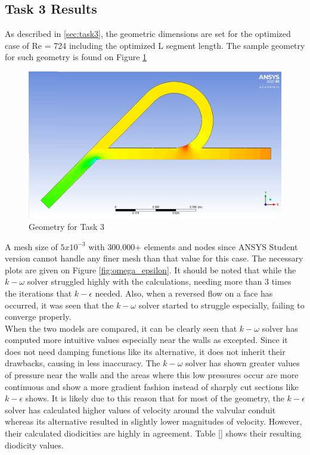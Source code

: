 \subsection{Task 3 Results}
\label{sec:task3results}

As described in \ref{sec:task3}, the geometric dimensions are set for the optimized case of Re = 724 including the optimized L segment length. The sample geometry for such geometry is found on Figure \ref{fig:task3sketch}

\begin{figure}[H]
    \centering
    \includegraphics[width=.7\textwidth]{images/task3/sketch.png}
    \caption{Geometry for Task 3}
    \label{fig:task3sketch}
\end{figure}

A mesh size of $5x10^{-3}$ with 300.000+ elements and nodes since ANSYS Student version cannot handle any finer mesh than that value for this case. The necessary plots are given on Figure \ref{fig:omega_epsilon}. It should be noted that while the $k - \omega$ solver struggled highly with the calculations, needing more than 3 times the iterations that $k- \epsilon$ needed. Also, when a reversed flow on a face has occurred, it was seen that the $k - \omega$ solver started to struggle especially, failing to converge properly. \\

When the two models are compared, it can be clearly seen that $k - \omega$ solver has computed more intuitive values especially near the walls as excepted. Since it does not need damping functions like its alternative, it does not inherit their drawbacks, causing in less inaccuracy. The $k - \omega$ solver has shown greater values of pressure near the walls and the areas where this low pressures occur are more continuous and show a more gradient fashion instead of sharply cut sections like $k - \epsilon$ shows. It is likely due to this reason that for most of the geometry, the $k - \epsilon$ solver has calculated higher values of velocity around the valvular conduit whereas its alternative resulted in slightly lower magnitudes of velocity. However, their calculated diodicities are highly in agreement. Table \ref{} shows their resulting diodicity values.\\

